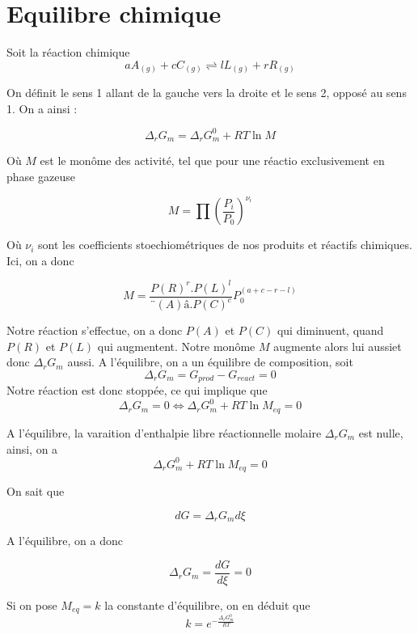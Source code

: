 \section{Equilibre chimique}

Soit la réaction chimique 
$$aA_{(g)}+cC_{(g)}\rightleftharpoons lL_{(g)}+rR_{(g)}$$

On définit le sens 1 allant de la gauche vers la droite et le sens 2, opposé au sens 1. On a ainsi :

$$\Delta_rG_m=\Delta_rG_m^0+RT\ln M$$

Où $M$ est le monôme des activité, tel que pour une réactio  exclusivement en phase gazeuse

$$M=\prod \left ( \frac{P_i}{P_0}\right ) ^{\nu_i}$$

Où $\nu_i$ sont les coefficients stoechiométriques de nos produits et réactifs chimiques. Ici, on a donc 

$$M=\frac{P(R)^r.P(L)^l}{¨(A)â.P(C)^c}P_0^{(a+c-r-l)}$$

Notre réaction s'effectue, on a donc $P(A)$ et $P(C)$ qui diminuent, quand $P(R)$ et $P(L)$ qui augmentent. Notre monôme $M$ augmente alors lui aussiet donc $\Delta_rG_m$ aussi. A l'équilibre, on a un équilibre de composition, soit
$$\Delta_rG_m = G_{prod}-G_{react}=0$$
Notre réaction est donc stoppée, ce qui implique que 
$$\Delta_rG_m = 0 \Leftrightarrow \Delta_rG_m^0 +RT \ln M_{eq}=0$$

\begin{definition}
A l'équilibre, la varaition d'enthalpie libre réactionnelle molaire $\Delta_rG_m$ est nulle, ainsi, on a 
\begin{equation}
\Delta_rG_m^0+RT \ln M_{eq}=0
\end{equation}
\end{definition}

On sait que 

$$dG=\Delta_rG_m d\xi$$

A l'équilibre, on a donc 

$$\Delta_rG_m=\frac{dG}{d\xi}=0$$

\begin{theorem}

Si on pose $M_{eq}=k$ la constante d'équilibre, on en déduit que 
\begin{equation}
k=e^{-\frac{\Delta_rG_m^0}{RT}}
\end{equation}

\end{theorem}


